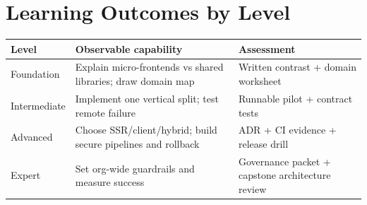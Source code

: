 \documentclass[11pt,letterpaper,oneside]{report}
\begin{document}
\chapter{Learning Outcomes by Level}
\begin{longtable}{>{\raggedright\arraybackslash}p{.2\linewidth}>{\raggedright\arraybackslash}p{.35\linewidth}>{\raggedright\arraybackslash}p{.33\linewidth}}\toprule Level & Observable capability & Assessment \\\midrule
Foundation & Explain micro-frontends vs shared libraries; draw domain map & Written contrast + domain worksheet\\
Intermediate & Implement one vertical split; test remote failure & Runnable pilot + contract tests\\
Advanced & Choose SSR/client/hybrid; build secure pipelines and rollback & ADR + CI evidence + release drill\\
Expert & Set org-wide guardrails and measure success & Governance packet + capstone architecture review\\\bottomrule\end{longtable}
\end{document}
